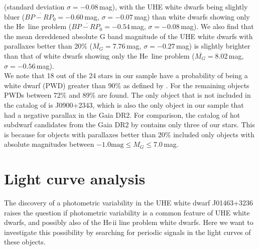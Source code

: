 \documentclass{aa}
\newcounter{Rco}
\newcommand{\Ionst}[1]{\setcounter{Rco}{#1}\Roman{Rco}}
\newcommand{\Ion}[2]{\mbox{#1\,{\scriptsize\Ionst{#2}}}}
\begin{document}
(standard deviation $\sigma=-0.08$\,mag), with the UHE white dwarfs
being slightly bluer ($\overline{BP-RP_0}=-0.60$\,mag, $\sigma=-0.07$\,mag) than white dwarfs
showing only the \Ion{He}{2} line problem ($\overline{BP-RP_0}=-0.54$\,mag, $\sigma=-0.08$\,mag).
We also find that the mean dereddened absolute G band magnitude
of the UHE white dwarfs with parallaxes better than 20\%
($\overline{M_G}=7.76$\,mag, $\sigma=-0.27$\,mag) is slightly brighter than
that of white dwarfs showing only the \Ion{He}{2} line problem
($\overline{M_G}=8.02$\,mag, $\sigma=-0.56$\,mag).\\
We note that 18 out of the 24 stars in our sample have a probability of
being a white dwarf (PWD) greater than 90\% as defined by
\cite{GentileFusillo+2019}. For the remaining objects PWDs
between 72\% and 89\% are found. The only object that is not included in
the catalog of \cite{GentileFusillo+2019} is J0900+2343, which
is also the only object in our sample that had a negative parallax in the
Gaia DR2. For comparison, the catalog of hot subdwarf candidates from the Gaia DR2 by
\cite{Geier+2019} contains only three of our stars. This is because
for objects with parallaxes better than 20\% \cite{Geier+2019} included only
objects with absolute magnitudes between $-1.0\mathrm{mag} \leq M_G \leq 7.0$\,mag.
 
\section{Light curve analysis}
\label{sect:lightcurves}
The discovery of a photometric variability in the UHE white dwarf
J01463+3236 raises the question if photometric variability is a
common feature of UHE white dwarfs, and possibly also of the He\,{\sc ii}
line problem white dwarfs. Here we want to investigate this possibility
by searching for periodic signals in the light curves of these objects.
 
\end{document}
